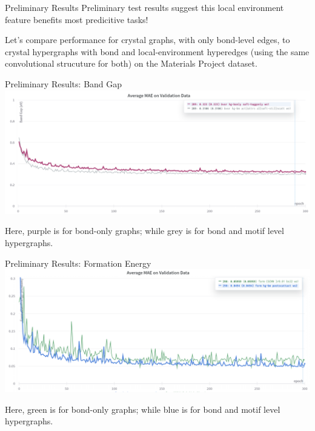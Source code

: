 \documentclass[11pt]{beamer}
\begin{document}
\begin{frame}{Preliminary Results}
Preliminary test results suggest this local environment feature benefits most predicitive tasks!

\vspace{0.8cm}

Let's compare performance for crystal graphs, with only bond-level edges, to crystal hypergraphs with bond and local-environment hyperedges (using the same convolutional strucuture for both) on the Materials Project dataset.
\end{frame}


\begin{frame}{Preliminary Results: Band Gap}
\includegraphics[scale=0.3]{bvsbm.png}

Here, purple is for bond-only graphs; while grey is for bond and motif level hypergraphs.
\end{frame}



\begin{frame}{Preliminary Results: Formation Energy}
\includegraphics[scale=0.3]{bvsbm_form.png}

Here, green is for bond-only graphs; while blue is for bond and motif level hypergraphs.
\end{frame}
\end{document}
